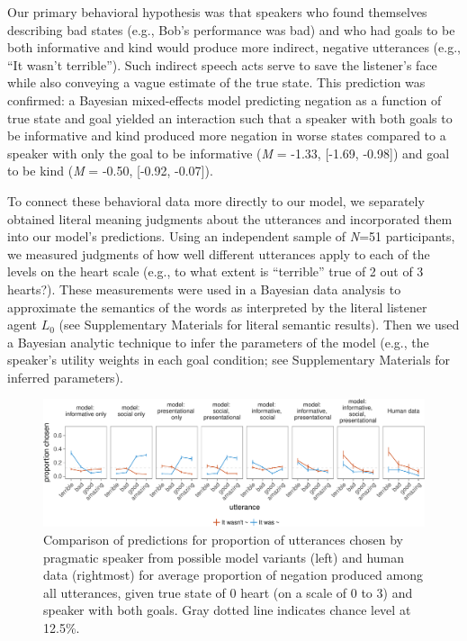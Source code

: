 \documentclass[12pt]{article}
\begin{document}
Our primary behavioral hypothesis was that speakers who found themselves
describing bad states (e.g., Bob's performance was bad) and who had
goals to be both informative and kind would produce more indirect,
negative utterances (e.g., \enquote{It wasn't terrible}). Such indirect
speech acts serve to save the listener's face while also conveying a
vague estimate of the true state. This prediction was confirmed: a
Bayesian mixed-effects model predicting negation as a function of true
state and goal yielded an interaction such that a speaker with both goals to be 
informative and kind produced more negation in worse states
compared to a speaker with only the goal to be informative (\emph{M} =
-1.33, {[}-1.69, -0.98{]}) and goal to be kind (\emph{M} = -0.50, {[}-0.92,
-0.07{]}).

To connect these behavioral data more directly to our model, we
separately obtained literal meaning judgments about the utterances and
incorporated them into our model's predictions. Using an independent
sample of \emph{N}=51 participants, we measured judgments of how well
different utterances apply to each of the levels on the heart scale
(e.g., to what extent is \enquote{terrible} true of 2 out of 3 hearts?).
These measurements were used in a Bayesian data analysis to
approximate the semantics of the words as interpreted by the literal
listener agent \(L_0\) (see Supplementary Materials for literal semantic
results). Then we used a Bayesian analytic technique \cite{lee2014} 
to infer the parameters of the model (e.g., the
speaker's utility weights in each goal condition; see Supplementary
Materials for inferred parameters).

\begin{figure}
\centering
\includegraphics[width=\textwidth]{polite_manuscript_files/figure-latex/comparison-1.pdf}
\caption{\label{fig:comparison}Comparison of predictions for proportion of
utterances chosen by pragmatic speaker from possible model variants
(left) and human data (rightmost) for average proportion of negation
produced among all utterances, given true state of 0 heart (on a scale
of 0 to 3) and speaker with both goals. Gray dotted line indicates
chance level at 12.5\%.}
\end{figure}
\end{document}
